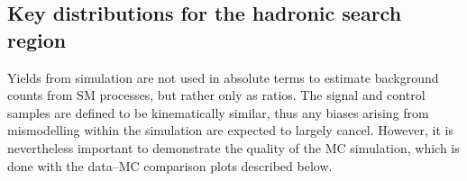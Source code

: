 \subsection{Key distributions for the hadronic search
  region\label{sec:mc-data-comp}}

Yields from simulation are not used in absolute terms to estimate
background counts from SM processes, but rather only as ratios. The
signal and control samples are defined to be kinematically similar,
thus any biases arising from mismodelling within the simulation are
expected to largely cancel. However, it is nevertheless important to
demonstrate the quality of the MC simulation, which is done with the
data--MC comparison plots described below.


\begin{figure}[h!]
  \centering
   \\
\end{figure}
